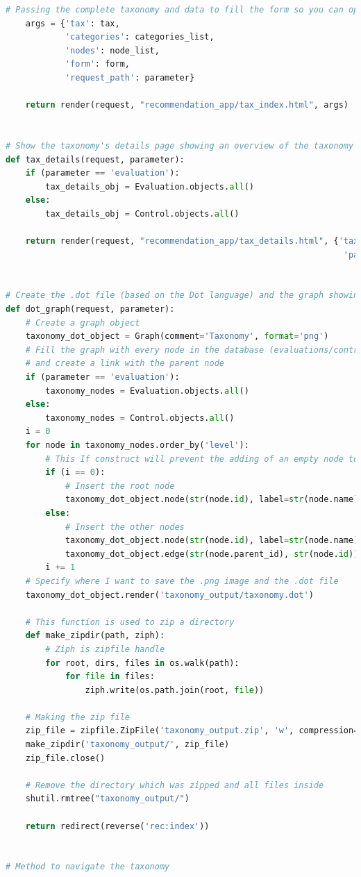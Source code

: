 \begin{lstlisting}[language=Python, caption={Parti principali del codice delle View della soluzione per gestire la navigazione 
	delle tassonomie, quella delle Evaluation e quella dei Controlli}]
	# Passing the complete taxonomy and data to fill the form so you can operate on the taxonomy
	args = {'tax': tax,
			'categories': categories_list,
			'nodes': node_list,
			'form': form,
			'request_path': parameter}

	return render(request, "recommendation_app/tax_index.html", args)


# Show the taxonomy's details page showing an overview of the taxonomy
def tax_details(request, parameter):
	if (parameter == 'evaluation'):
		tax_details_obj = Evaluation.objects.all()
	else:
		tax_details_obj = Control.objects.all()

	return render(request, "recommendation_app/tax_details.html", {'tax_details': tax_details_obj,
																	'parameter': parameter})


# Create the .dot file (based on the Dot language) and the graph showing the taxonomy in .png format
def dot_graph(request, parameter):
	# Create a graph object
	taxonomy_dot_object = Graph(comment='Taxonomy', format='png')
	# Fill the graph with every node in the database (evaluations/controls node and categories nodes), 
	# and create a link with the parent node
	if (parameter == 'evaluation'):
		taxonomy_nodes = Evaluation.objects.all()
	else:
		taxonomy_nodes = Control.objects.all()
	i = 0
	for node in taxonomy_nodes.order_by('level'):
		# This If construct will prevent the adding of an empty node to the root node in the graph
		if (i == 0):
			# Insert the root node
			taxonomy_dot_object.node(str(node.id), label=str(node.name))
		else:
			# Insert the other nodes
			taxonomy_dot_object.node(str(node.id), label=str(node.name))
			taxonomy_dot_object.edge(str(node.parent_id), str(node.id))
		i += 1
	# Specify where I want to save the .png image and the .dot file
	taxonomy_dot_object.render('taxonomy_output/taxonomy.dot')

	# This function is used to zip a directory
	def make_zipdir(path, ziph):
		# Ziph is zipfile handle
		for root, dirs, files in os.walk(path):
			for file in files:
				ziph.write(os.path.join(root, file))

	# Making the zip file
	zip_file = zipfile.ZipFile('taxonomy_output.zip', 'w', compression=zipfile.ZIP_DEFLATED)
	make_zipdir('taxonomy_output/', zip_file)
	zip_file.close()

	# Remove the directory which was zipped and all files inside
	shutil.rmtree("taxonomy_output/")

	return redirect(reverse('rec:index'))


# Method to navigate the taxonomy



\end{lstlisting}
